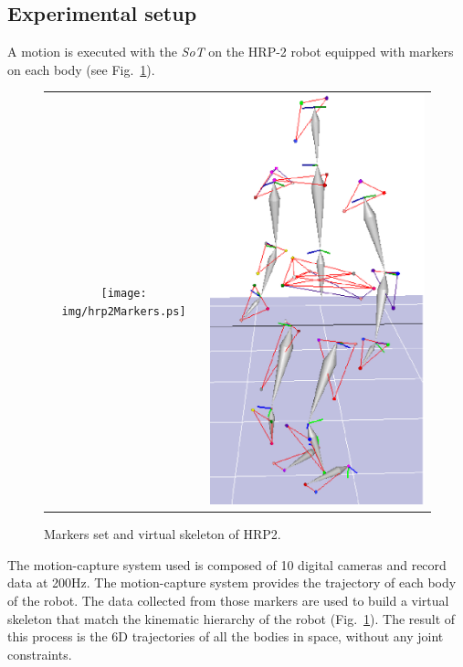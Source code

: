 \documentclass[letterpaper, 10pt, conference]{ieeeconf}      %
\begin{document}
\subsection{Experimental setup}
A motion is executed with the \emph{SoT} on the HRP-2 robot equipped with markers on each
body (see Fig.~\ref{fig:hrp2Markers}).
\begin{figure}[t]
  \centering
  \begin{tabular}{cc}
    \texttt{[image: img/hrp2Markers.ps]} &
    \includegraphics[height=0.7\linewidth]{img/skel.ps} \\
  \end{tabular}
  \caption{Markers set and virtual skeleton of HRP2.}
  \label{fig:hrp2Markers}
\end{figure}
The motion-capture system used is composed of 10 digital cameras and record data
at 200Hz. 
The motion-capture system provides the trajectory of each body of the robot.
The data collected from those markers
are used to build a virtual skeleton that match the kinematic hierarchy of the robot (Fig.~\ref{fig:hrp2Markers}).
The result of this process is the 6D trajectories of all the bodies in space, without any joint constraints.
\end{document}
